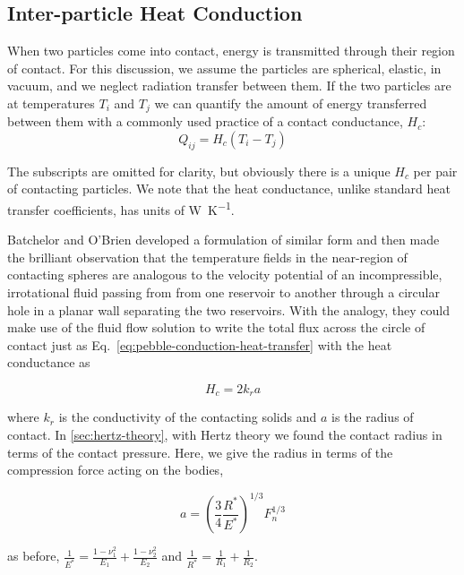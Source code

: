 \subsection{Inter-particle Heat Conduction}\label{sec:ht-pebble-conduction}

When two particles come into contact, energy is transmitted through their region of contact. For this discussion, we assume the particles are spherical, elastic, in vacuum, and we neglect radiation transfer between them. If the two particles are at temperatures $T_i$ and $T_j$ we can quantify the amount of energy transferred between them with a commonly used practice of a contact conductance, $H_c$:
\begin{equation}\label{eq:pebble-conduction-heat-transfer}
	Q_{ij} = H_{c}(T_i - T_j)
\end{equation}

The subscripts are omitted for clarity, but obviously there is a unique $H_c$ per pair of contacting particles. We note that the heat conductance, unlike standard heat transfer coefficients, has units of \si{\watt\per\kelvin}.

Batchelor and O'Brien\cite{Batchelor1977} developed a formulation of similar form and then made the brilliant observation that the temperature fields in the near-region of contacting spheres are analogous to the velocity potential of an incompressible, irrotational fluid passing from from one reservoir to another through a circular hole in a planar wall separating the two reservoirs. With the analogy, they could make use of the fluid flow solution to write the total flux across the circle of contact just as Eq.~\ref{eq:pebble-conduction-heat-transfer} with the heat conductance as

\begin{equation}\label{eq:batchelor-pebble-conductance}
	H_c = 2k_ra
\end{equation}

where $k_r$ is the conductivity of the contacting solids and $a$ is the radius of contact. In \cref{sec:hertz-theory}, with Hertz theory we found the contact radius in terms of the contact pressure. Here, we give the radius in terms of the compression force acting on the bodies,

\begin{equation}
	a =  \left(\frac{3}{4}\frac{R^*}{E^*}\right)^{1/3}F_n^{1/3}	
\end{equation}

as before, $\frac{1}{E^*} = \frac{1-\nu_1^2}{E_1} + \frac{1-\nu_2^2}{E_2}$ and $\frac{1}{R^*} = \frac{1}{R_1} + \frac{1}{R_2}$. 

